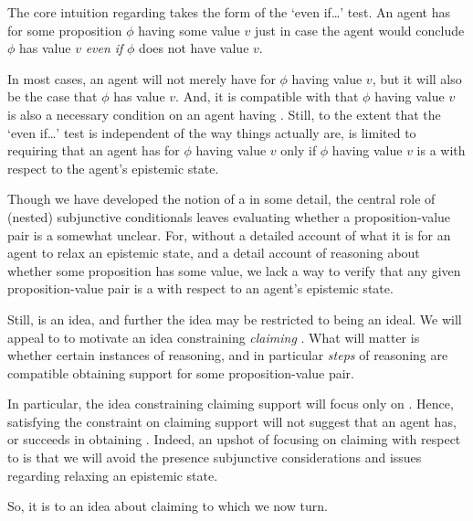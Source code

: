 \begin{note}
  The core intuition regarding \support{} takes the form of the `even if\dots' test.
  An agent has \support{} for some proposition \(\phi\) having some value \(v\) just in case the agent would conclude \(\phi\) has value \(v\) \emph{even if} \(\phi\) does not have value \(v\).

  In most cases, an agent will not merely have \support{} for \(\phi\) having value \(v\), but it will also be the case that \(\phi\) has value \(v\).
  And, it is compatible with \ideaS{} that \(\phi\) having value \(v\) is also a necessary condition on an agent having \support{}.
  Still, to the extent that the `even if\dots' test is independent of the way things actually are, \ideaS{} is limited to requiring that an agent has \support{} for \(\phi\) having value \(v\) only if \(\phi\) having value \(v\) is a \sink{} with respect to the agent's epistemic state.

  Though we have developed the notion of a \sink{} in some detail, the central role of (nested) subjunctive conditionals leaves evaluating whether a proposition-value pair is a \sink{} somewhat unclear.
  For, without a detailed account of what it is for an agent to relax an epistemic state, and a detail account of reasoning about whether some proposition has some value, we lack a way to verify that any given proposition-value pair is a \sink{} with respect to an agent's epistemic state.

  Still, \ideaS{} is an idea, and further the idea may be restricted to being an ideal.
  We will appeal to \ideaS{} to motivate an idea constraining \emph{claiming} \support{}.
  What will matter is whether certain instances of reasoning, and in particular \emph{steps} of reasoning are compatible obtaining support for some proposition-value pair.

  In particular, the idea constraining claiming support will focus only on .
  Hence, satisfying the constraint on claiming support will not suggest that an agent has, or succeeds in obtaining \support{}.
  Indeed, an upshot of focusing on claiming with respect to  is that we will avoid the presence subjunctive considerations and issues regarding relaxing an epistemic state.

  So, it is to an idea about claiming \support{} to which we now turn.
\end{note}


